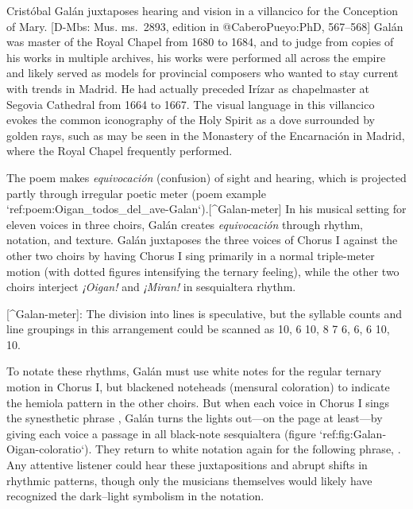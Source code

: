 Cristóbal Galán juxtaposes hearing and vision in a villancico for the Conception of Mary.
[D-Mbs: Mus. ms.~2893, edition in @CaberoPueyo:PhD, 567--568]
Galán was master of the Royal Chapel from 1680 to 1684, and to judge from copies of his works in multiple archives, his works were performed all across the empire and likely served as models for provincial composers who wanted to stay current with trends in Madrid.
He had actually preceded Irízar as chapelmaster at Segovia Cathedral from 1664 to 1667.
    \Autocite{Baron-Sage:GalanC}
The visual language in this villancico evokes the common iconography of the Holy Spirit as a dove surrounded by golden rays, such as may be seen in the Monastery of the Encarnación in Madrid, where the Royal Chapel frequently performed.
\Autocite[69--70, 81: The image was painted on the ceiling of the monastery's Capilla del Cordero and when a new church building was added later, this image was incorporated as the central element atop the high altar.]{Sanz:GuiaDescalzasEncarnacion}

The poem makes \emph{equivocación} (confusion) of sight and hearing, which is projected partly through irregular poetic meter (poem example `ref:poem:Oigan_todos_del_ave-Galan`).[^Galan-meter]  In his musical setting for eleven voices in three choirs, Galán creates \emph{equivocación} through rhythm, notation, and texture.
Galán juxtaposes the three voices of Chorus I against the other two choirs by having Chorus I sing primarily in a normal triple-meter motion (with dotted figures intensifying the ternary feeling), while the other two choirs interject \emph{¡Oigan!} and \emph{¡Miran!} in sesquialtera rhythm.

[^Galan-meter]:  The division into lines is speculative, but the syllable counts and line groupings in this arrangement could be scanned as  10, 6 10, 8 7 6, 6, 6 10, 10.


\label{poem:Oigan_todos_del_ave-Galan}

To notate these rhythms, Galán must use white notes for the regular ternary motion in Chorus I, but blackened noteheads (mensural coloration) to indicate the hemiola pattern in the other choirs.
But when each voice in Chorus I sings the synesthetic phrase , Galán turns the lights out---on the page at least---by giving each voice a passage in all black-note sesquialtera (figure `ref:fig:Galan-Oigan-coloratio`).
They return to white notation again for the following phrase, .
Any attentive listener could hear these juxtapositions and abrupt shifts in rhythmic patterns, though only the musicians themselves would likely have recognized the dark--light symbolism in the notation.
\Autocite[36]{Kendrick:Jeremiah}



